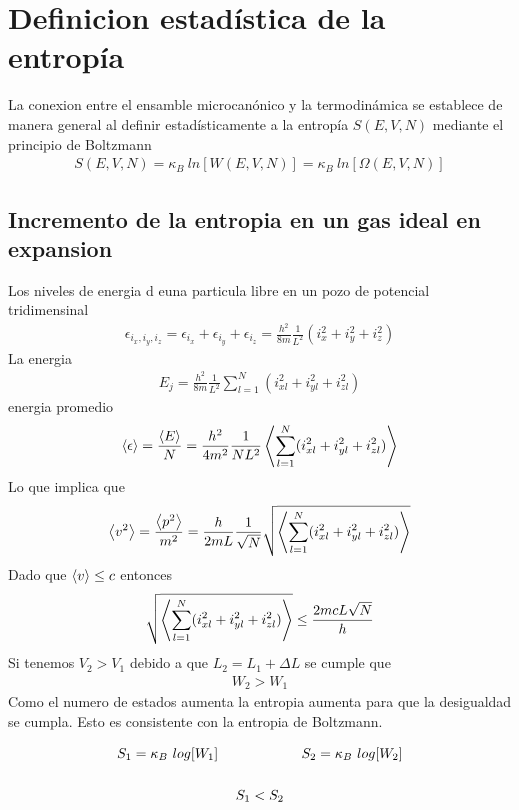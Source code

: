 \documentclass{article}
\begin{document}
\section{Definicion estadística de la entropía }
La conexion entre el ensamble microcanónico y la termodinámica se establece de manera general al definir estadísticamente a la entropía $ S(E,V,N ) $ mediante el principio de Boltzmann 
\begin{gather*}
  S(E,V,N ) = \kappa_B \ ln[W(E,V,N )] = \kappa_B \ ln[\Omega (E,V,N )]
\end{gather*}

\subsection{Incremento de la entropia en un gas ideal en expansion }
Los niveles de energia d euna particula libre en un pozo de potencial tridimensinal 
\begin{gather*}
  \epsilon _{i_x,i_y,i_z } = \epsilon _{i_x }  + \epsilon _{i_y } + \epsilon _{i_z }  = \frac{h^2 }{8m } \frac{1}{L^2 }(i_x^2+i_y^2+i_z^2) 
\end{gather*}
La energia 
\begin{gather*}
  E_j = \frac{h^2 }{8m } \frac{1}{L^2 } \displaystyle\sum_{l=1 }^{N }(i _{xl } ^2 +i _{yl } ^2+i _{zl } ^2) 
\end{gather*}
energia promedio 
\begin{gather*}
  \expval{\epsilon} = \frac{\expval{E }}{N } =\frac{h^2 }{4m^2 } \frac{1}{NL^2 } \expval{\displaystyle\sum_{l=1 }^{N }(i _{xl } ^2 +i _{yl } ^2+i _{zl } ^2)}
\end{gather*}
Lo que implica que 
\begin{gather*}
  \expval{v^2 } = \frac{\expval{p^2 }}{m^2 } = \frac{h }{2mL } \frac{1}{\sqrt{N } } \sqrt{\expval{\displaystyle\sum_{l=1 }^{N }(i _{xl } ^2 +i _{yl } ^2+i _{zl } ^2)} }
\end{gather*}
Dado que $ \expval{v } \leq c  $ entonces 
\begin{gather*}
   \sqrt{\expval{\displaystyle\sum_{l=1 }^{N }(i _{xl } ^2 +i _{yl } ^2+i _{zl } ^2)} } \leq \frac{2mcL \sqrt{N }}{h  }
\end{gather*}
Si tenemos $ V_2 > V_1  $ debido a que $ L_2 = L_1 + \Delta L  $ se cumple que 
\begin{gather*}
  W_2 >W_1  
\end{gather*}
Como el numero de estados aumenta la entropia aumenta para que la desigualdad se cumpla. Esto es consistente con la entropia de Boltzmann.

\begin{gather*}
  S_1 = \kappa_B\  log[W_1] \qquad \qquad \qquad S_2   = \kappa_B\  log[W_2]\\
  \hfill \\
  S_1 < S_2
\end{gather*}
\end{document}

